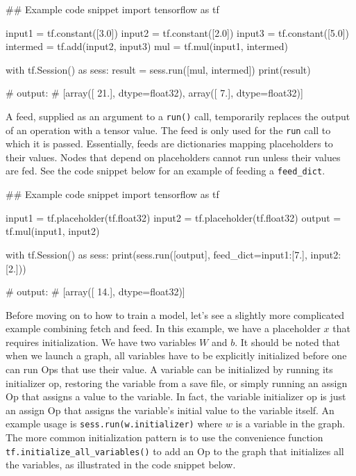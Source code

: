 \documentclass{tufte-handout}
\begin{document}
\begin{python}
## Example code snippet
import tensorflow as tf

input1 = tf.constant([3.0])
input2 = tf.constant([2.0])
input3 = tf.constant([5.0])
intermed = tf.add(input2, input3)
mul = tf.mul(input1, intermed)

with tf.Session() as sess:
  result = sess.run([mul, intermed])
  print(result)

# output:
# [array([ 21.], dtype=float32), array([ 7.], dtype=float32)]

\end{python}

A feed, supplied as an argument to a \texttt{run()} call, temporarily replaces the output of an operation with a tensor value. The feed is only used for the \texttt{run} call to which it is passed. Essentially, feeds are dictionaries mapping placeholders to their values. Nodes that depend on placeholders cannot run unless their values are fed. See the code snippet below for an example of feeding a \texttt{feed\_dict}. 

\begin{python}
## Example code snippet
import tensorflow as tf

input1 = tf.placeholder(tf.float32)
input2 = tf.placeholder(tf.float32)
output = tf.mul(input1, input2)

with tf.Session() as sess:
  print(sess.run([output], feed_dict={input1:[7.], input2:[2.]}))

# output:
# [array([ 14.], dtype=float32)]

\end{python}

Before moving on to how to train a model, let's see a slightly more complicated example combining fetch and feed. In this example, we have a placeholder $x$ that requires initialization. We have two variables $W$ and $b$. It should be noted that when we launch a graph, all variables have to be explicitly initialized before one can run Ops that use their value. A variable can be initialized by running its initializer op, restoring the variable from a save file, or simply running an assign Op that assigns a value to the variable. In fact, the variable initializer op is just an assign Op that assigns the variable's initial value to the variable itself. An example usage is \texttt{sess.run(w.initializer)} where $w$ is a variable in the graph. The more common initialization pattern is to use the convenience function \texttt{tf.initialize\_all\_variables()} to add an Op to the graph that initializes all the variables, as illustrated in the code snippet below.
\end{document}
